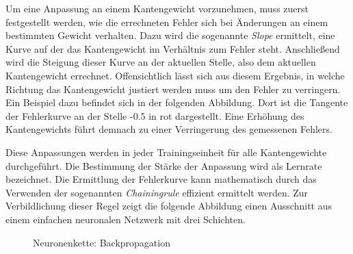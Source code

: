 Um eine Anpassung an einem Kantengewicht vorzunehmen, muss zuerst
festgestellt werden, wie die errechneten Fehler sich bei Änderungen an einem
bestimmten Gewicht verhalten. Dazu wird die sogenannte \emph{Slope} ermittelt,
eine Kurve auf der das Kantengewicht im Verhältnis zum Fehler steht.
Anschließend wird die Steigung dieser Kurve an der aktuellen Stelle, also
dem aktuellen Kantengewicht errechnet.
Offensichtlich lässt sich aus diesem Ergebnis, in welche Richtung das Kantengewicht
justiert werden muss um den Fehler zu verringern.
Ein Beispiel dazu befindet sich in der folgenden Abbildung. Dort ist die Tangente
der Fehlerkurve an der Stelle -0.5 in rot dargestellt.
Eine Erhöhung des Kantengewichts führt demnach zu einer Verringerung des
gemessenen Fehlers.\bigskip

\begin{figure}[H]
    \centering
\end{figure}

Diese Anpassungen werden in jeder Trainingseinheit für alle Kantengewichte
durchgeführt. Die Bestimmung der Stärke der Anpassung wird als Lernrate
bezeichnet.
Die Ermittlung der Fehlerkurve kann mathematisch durch das Verwenden der
sogenannten \emph{Chainingrule} \cite{Rumelhart} effizient ermittelt werden.
Zur Verbildlichung dieser Regel zeigt die folgende Abbildung
einen Ausschnitt aus einem einfachen neuronalen Netzwerk mit drei Schichten.\bigskip

\begin{figure}[H]
    \centering
    \caption{Neuronenkette: Backpropagation}
\end{figure}

